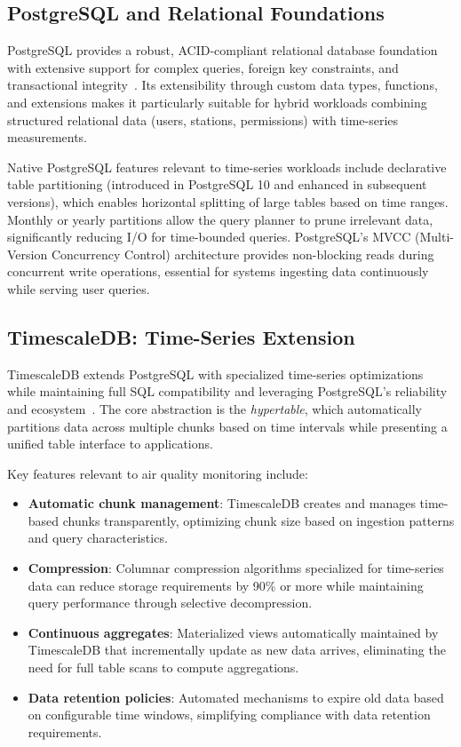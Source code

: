 \subsection{PostgreSQL and Relational Foundations}
\label{subsec:lit_postgresql}

PostgreSQL provides a robust, ACID-compliant relational database foundation with extensive support for complex queries, foreign key constraints, and transactional integrity~\citep{postgresql}. Its extensibility through custom data types, functions, and extensions makes it particularly suitable for hybrid workloads combining structured relational data (users, stations, permissions) with time-series measurements.

Native PostgreSQL features relevant to time-series workloads include declarative table partitioning (introduced in PostgreSQL 10 and enhanced in subsequent versions), which enables horizontal splitting of large tables based on time ranges. Monthly or yearly partitions allow the query planner to prune irrelevant data, significantly reducing I/O for time-bounded queries. PostgreSQL's MVCC (Multi-Version Concurrency Control) architecture provides non-blocking reads during concurrent write operations, essential for systems ingesting data continuously while serving user queries.

\subsection{TimescaleDB: Time-Series Extension}
\label{subsec:lit_timescaledb}

TimescaleDB extends PostgreSQL with specialized time-series optimizations while maintaining full SQL compatibility and leveraging PostgreSQL's reliability and ecosystem~\citep{timescale}. The core abstraction is the \textit{hypertable}, which automatically partitions data across multiple chunks based on time intervals while presenting a unified table interface to applications.

Key features relevant to air quality monitoring include:

\begin{itemize}
    \item \textbf{Automatic chunk management}: TimescaleDB creates and manages time-based chunks transparently, optimizing chunk size based on ingestion patterns and query characteristics.
    \item \textbf{Compression}: Columnar compression algorithms specialized for time-series data can reduce storage requirements by 90\% or more while maintaining query performance through selective decompression.
    \item \textbf{Continuous aggregates}: Materialized views automatically maintained by TimescaleDB that incrementally update as new data arrives, eliminating the need for full table scans to compute aggregations.
    \item \textbf{Data retention policies}: Automated mechanisms to expire old data based on configurable time windows, simplifying compliance with data retention requirements.
\end{itemize}

